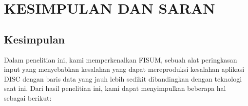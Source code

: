 \chapter{KESIMPULAN DAN SARAN}
\label{chap:kesimpulandansaran}


\section{Kesimpulan}
\label{sec:kesimpulan}

Dalam penelitian ini, kami memperkenalkan FISUM, 
sebuah alat peringkasan input yang menyebabkan 
kesalahan yang dapat mereproduksi kesalahan aplikasi 
DISC dengan baris data yang jauh lebih sedikit dibandingkan 
dengan teknologi saat ini. Dari hasil penelitian ini,
kami dapat menyimpulkan beberapa hal sebagai berikut:




